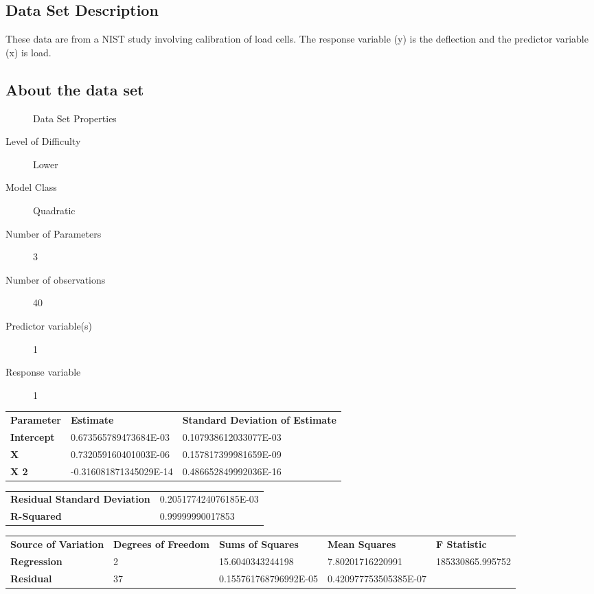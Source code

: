 \documentclass[10pt]{article}
\begin{document}
\subsection*{Data Set Description}
These data are from a NIST study involving calibration of load cells. The response variable (y) is the deflection and the predictor variable (x) is load.


\subsection*{About the data set}

\begin{description}
   \item[]Data Set Properties
   \item[Level of Difficulty] Lower
   \item[Model Class] Quadratic
   \item[Number of Parameters] 3
   \item[Number of observations] 40
   \item[Predictor variable(s)] 1
   \item[Response variable] 1
\end{description}

\begin{tabular}{lll}
   \textbf{Parameter} & \textbf{Estimate} & \textbf{Standard Deviation of Estimate}  \\ 
   \textbf{Intercept} & 0.673565789473684E-03 &  0.107938612033077E-03\\ 
	\textbf{X} & 0.732059160401003E-06  &   0.157817399981659E-09 \\ 
   \textbf{X 2} & -0.316081871345029E-14  &  0.486652849992036E-16 \\ 
\end{tabular} 

\begin{tabular}{ll}
    \textbf{Residual Standard Deviation} &  0.205177424076185E-03  \\ 
    \textbf{R-Squared} & 0.99999990017853   \\  
\end{tabular}


\begin{tabular}{lllll}
   \textbf{Source of Variation} & \textbf{Degrees of Freedom} & \textbf{Sums of Squares} & \textbf{Mean Squares}  & \textbf{F Statistic} \\ 
   \textbf{Regression} & 2 & 15.6040343244198 & 7.80201716220991 & 185330865.995752 \\ 
	\textbf{Residual} & 37 & 0.155761768796992E-05 & 0.420977753505385E-07 &  \\ 
\end{tabular} 
\end{document}
